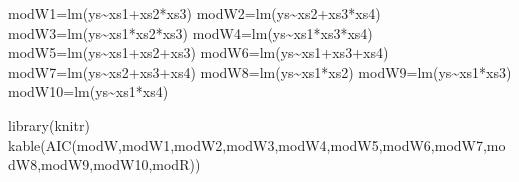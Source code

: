 \documentclass[
]{book}
\newenvironment{Shaded}{\begin{snugshade}}{\end{snugshade}}
\newcommand{\FunctionTok}[1]{\textcolor[rgb]{0.00,0.00,0.00}{#1}}
\newcommand{\NormalTok}[1]{#1}
\newcommand{\OtherTok}[1]{\textcolor[rgb]{0.56,0.35,0.01}{#1}}
\newcommand{\SpecialCharTok}[1]{\textcolor[rgb]{0.00,0.00,0.00}{#1}}
\begin{document}
\begin{Shaded}
\begin{Highlighting}[]
\NormalTok{modW1}\OtherTok{=}\FunctionTok{lm}\NormalTok{(ys}\SpecialCharTok{\textasciitilde{}}\NormalTok{xs1}\SpecialCharTok{+}\NormalTok{xs2}\SpecialCharTok{*}\NormalTok{xs3)}
\NormalTok{modW2}\OtherTok{=}\FunctionTok{lm}\NormalTok{(ys}\SpecialCharTok{\textasciitilde{}}\NormalTok{xs2}\SpecialCharTok{+}\NormalTok{xs3}\SpecialCharTok{*}\NormalTok{xs4)}
\NormalTok{modW3}\OtherTok{=}\FunctionTok{lm}\NormalTok{(ys}\SpecialCharTok{\textasciitilde{}}\NormalTok{xs1}\SpecialCharTok{*}\NormalTok{xs2}\SpecialCharTok{*}\NormalTok{xs3)}
\NormalTok{modW4}\OtherTok{=}\FunctionTok{lm}\NormalTok{(ys}\SpecialCharTok{\textasciitilde{}}\NormalTok{xs1}\SpecialCharTok{*}\NormalTok{xs3}\SpecialCharTok{*}\NormalTok{xs4)}
\NormalTok{modW5}\OtherTok{=}\FunctionTok{lm}\NormalTok{(ys}\SpecialCharTok{\textasciitilde{}}\NormalTok{xs1}\SpecialCharTok{+}\NormalTok{xs2}\SpecialCharTok{+}\NormalTok{xs3)}
\NormalTok{modW6}\OtherTok{=}\FunctionTok{lm}\NormalTok{(ys}\SpecialCharTok{\textasciitilde{}}\NormalTok{xs1}\SpecialCharTok{+}\NormalTok{xs3}\SpecialCharTok{+}\NormalTok{xs4)}
\NormalTok{modW7}\OtherTok{=}\FunctionTok{lm}\NormalTok{(ys}\SpecialCharTok{\textasciitilde{}}\NormalTok{xs2}\SpecialCharTok{+}\NormalTok{xs3}\SpecialCharTok{+}\NormalTok{xs4)}
\NormalTok{modW8}\OtherTok{=}\FunctionTok{lm}\NormalTok{(ys}\SpecialCharTok{\textasciitilde{}}\NormalTok{xs1}\SpecialCharTok{*}\NormalTok{xs2)}
\NormalTok{modW9}\OtherTok{=}\FunctionTok{lm}\NormalTok{(ys}\SpecialCharTok{\textasciitilde{}}\NormalTok{xs1}\SpecialCharTok{*}\NormalTok{xs3)}
\NormalTok{modW10}\OtherTok{=}\FunctionTok{lm}\NormalTok{(ys}\SpecialCharTok{\textasciitilde{}}\NormalTok{xs1}\SpecialCharTok{*}\NormalTok{xs4)}
\end{Highlighting}
\end{Shaded}

\begin{Shaded}
\begin{Highlighting}[]
\FunctionTok{library}\NormalTok{(knitr)}
\FunctionTok{kable}\NormalTok{(}\FunctionTok{AIC}\NormalTok{(modW,modW1,modW2,modW3,modW4,modW5,modW6,modW7,modW8,modW9,modW10,modR))}
\end{Highlighting}
\end{Shaded}
\end{document}
